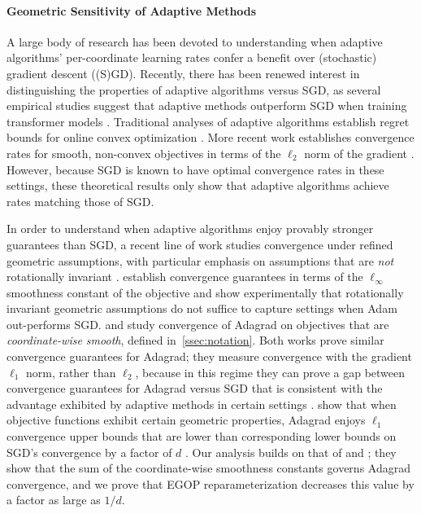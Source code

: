 \documentclass{article}
\begin{document}
\paragraph{Geometric Sensitivity of Adaptive Methods} A large body of research has been devoted to understanding when adaptive algorithms' per-coordinate learning rates confer a benefit over (stochastic) gradient descent ((S)GD). Recently, there has been renewed interest in distinguishing the properties of adaptive algorithms versus SGD, as several empirical studies suggest that adaptive methods outperform SGD when training transformer models \cite{kunstner2024heavy,zhang2024transformers}. Traditional analyses of adaptive algorithms establish regret bounds for online convex optimization \cite{duchi2011adaptive, hazan2016introduction}. More recent work establishes convergence rates for smooth, non-convex objectives in terms of the $\ell_2$ norm of the gradient \cite{defossez2020simple,ward2020adagrad}. However, because SGD is known to have optimal convergence rates in these settings, these theoretical results only show that adaptive algorithms achieve rates matching those of SGD.

In order to understand when adaptive algorithms enjoy provably stronger guarantees than SGD, a recent line of work studies convergence under refined geometric assumptions, with particular emphasis on assumptions that are \textit{not} rotationally invariant \cite{jiang2024convergence, liu2024adagrad, xie2024adamexploitsellinftygeometryloss}. \citet{xie2024adamexploitsellinftygeometryloss} establish convergence guarantees in terms of the $\ell_{\infty}$ smoothness constant of the objective and show experimentally that rotationally invariant geometric assumptions do not suffice to capture settings when Adam out-performs SGD. \citet{jiang2024convergence} and \citet{liu2024adagrad} study convergence of Adagrad on objectives that are \textit{coordinate-wise smooth}, defined in~\cref{ssec:notation}. Both works prove similar convergence guarantees for Adagrad; they measure convergence with the gradient $\ell_1$ norm, rather than $\ell_2$, because in this regime they can prove a gap between convergence guarantees for Adagrad versus SGD that is consistent with the advantage exhibited by adaptive methods in certain settings \cite{jiang2024convergence}.
\citet{jiang2024convergence} show that when objective functions exhibit certain geometric properties, Adagrad enjoys $\ell_1$ convergence upper bounds that are lower than corresponding lower bounds on SGD's convergence by a factor of $d$ \cite{jiang2024convergence}. Our analysis builds on that of \citet{jiang2024convergence} and \citet{liu2024adagrad}; they show that the sum of the coordinate-wise smoothness constants governs Adagrad convergence, and we prove that EGOP reparameterization decreases this value by a factor as large as $1/d$.
\end{document}
